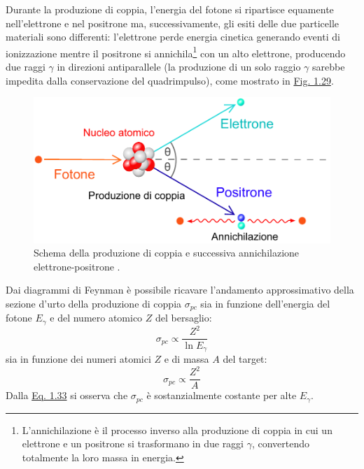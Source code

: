 \documentclass[12pt,a4paper,twoside]{report}
\begin{document}
	Durante la produzione di coppia, l'energia del fotone si ripartisce equamente nell'elettrone e nel positrone ma, successivamente, gli esiti delle due particelle materiali sono differenti: l'elettrone perde energia cinetica generando eventi di ionizzazione mentre il positrone si annichila\footnote{L'annichilazione è il processo inverso alla produzione di coppia in cui un elettrone e un positrone si trasformano in due raggi $\gamma$, convertendo totalmente la loro massa in energia.} con un alto elettrone, producendo due raggi $\gamma$ in direzioni antiparallele (la produzione di un solo raggio $\gamma$ sarebbe impedita dalla conservazione del quadrimpulso), come mostrato in \hyperref[fig:pair_production]{Fig. 1.29}.
	\begin{figure}[H]
		\centering
		\includegraphics[width=0.9\linewidth]{pair_production.pdf}
		\caption{Schema della produzione di coppia e successiva annichilazione elettrone-positrone \cite{pairProd}.}
		\label{fig:pair_production}
	\end{figure}
	Dai diagrammi di Feynman è possibile ricavare l'andamento approssimativo della sezione d'urto della produzione di coppia $\sigma_{pc}$ sia in funzione dell'energia del fotone $E_\gamma$ e del numero atomico $Z$ del bersaglio:
	\begin{equation}
		\sigma_{pc}\propto \frac{Z^2}{\ln{E_\gamma}}
		\label{eq:sigma_pc1}
	\end{equation}
	sia in funzione dei numeri atomici $Z$ e di massa $A$ del target:
	\begin{equation}
		\sigma_{pc}\propto \frac{Z^2}{A}
		\label{eq:sigma_pc2}
	\end{equation}
	Dalla \hyperref[eq:sigma_pc1]{Eq. 1.33} si osserva che $\sigma_{pc}$ è sostanzialmente costante per alte $E_\gamma$.	
	
\end{document}
